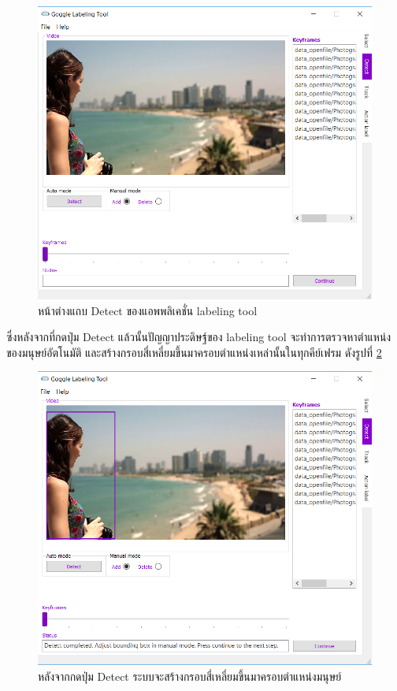 \begin{figure}[!ht]
    \centering
    \includegraphics[width=1\textwidth]{chapter3/images/3_6/detect.png}
    \caption{หน้าต่างแถบ Detect ของแอพพลิเคชั่น labeling tool}
    \label{fig:detectTab}
\end{figure}
\clearpage
ซึ่งหลังจากที่กดปุ่ม Detect แล้วนั้นปัญญาประดิษฐ์ของ labeling tool จะทำการตรวจหาตำแหน่งของมนุษย์อัตโนมัติ
และสร้างกรอบสี่เหลี่ยมขึ้นมาครอบตำแหน่งเหล่านั้นในทุกคีย์เฟรม ดังรูปที่ \ref{fig:detectTab_detected}
\begin{figure}[!ht]
    \centering
    \includegraphics[width=1\textwidth]{chapter3/images/3_6/detect_complete.png}
    \caption{หลังจากกดปุ่ม Detect ระบบจะสร้างกรอบสี่เหลี่ยมขึ้นมาครอบตำแหน่งมนุษย์}
    \label{fig:detectTab_detected}
\end{figure}

